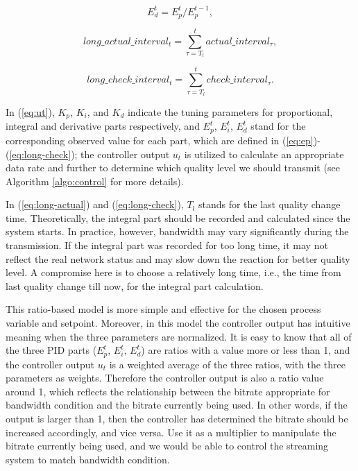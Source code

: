 \documentclass[journal]{IEEEtran}
\begin{document}
\begin{equation}
\label{eq:ed}
E_d^t = E_p^t/E_p^{t - 1} ,
\end{equation}

\begin{equation}
\label{eq:long-actual}
long\_actual\_interva{l_t} = \sum\limits_{\tau = {T_l}}^t {actual\_interva{l_\tau}} ,
\end{equation}

\begin{equation}
\label{eq:long-check}
long\_check\_interva{l_t} = \sum\limits_{\tau = {T_l}}^t {check\_interva{l_\tau}} .
\end{equation}


In (\ref{eq:ut}), $K_p$, $K_i$, and $K_d$ indicate the tuning parameters for proportional, integral and derivative parts respectively, and $E_p^t$, $E_i^t$, $E_d^t$ stand for the corresponding observed value for each part, which are defined in (\ref{eq:ep})-(\ref{eq:long-check}); the controller output $u_t$ is utilized to calculate an appropriate data rate and further to determine which quality level we should transmit (see Algorithm \ref{algo:control} for more details).

In (\ref{eq:long-actual}) and (\ref{eq:long-check}), $T_l$ stands for the last quality change time. Theoretically, the integral part should be recorded and calculated since the system starts. In practice, however, bandwidth may vary significantly during the transmission. If the integral part was recorded for too long time, it may not reflect the real network status and may slow down the reaction for better quality level. A compromise here is to choose a relatively long time, i.e., the time from last quality change till now, for the integral part calculation.

This ratio-based model is more simple and effective for the chosen process variable and setpoint. Moreover, in this model the controller output has intuitive meaning when the three parameters are normalized. It is easy to know that all of the three PID parts ($E_p^t$, $E_i^t$, $E_d^t$) are ratios with a value more or less than 1, and the controller output $u_t$ is a weighted average of the three ratios, with the three parameters as weights. Therefore the controller output is also a ratio value around 1, which reflects the relationship between the bitrate appropriate for bandwidth condition and the bitrate currently being used. In other words, if the output is larger than 1, then the controller has determined the bitrate should be increased accordingly, and vice versa. Use it as a multiplier to manipulate the bitrate currently being used, and we would be able to control the streaming system to match bandwidth condition.
\end{document}
